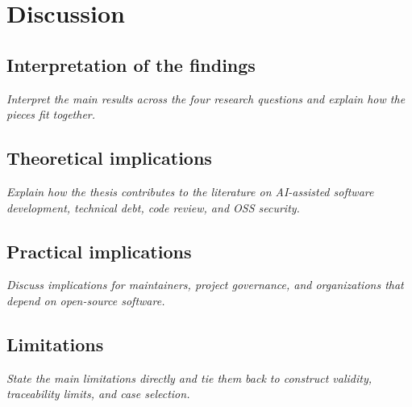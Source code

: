 \chapter{Discussion}
\label{ch:discussion}

\section{Interpretation of the findings}
\textit{Interpret the main results across the four research questions and explain how the pieces fit together.}

\section{Theoretical implications}
\textit{Explain how the thesis contributes to the literature on AI-assisted software development, technical debt, code review, and OSS security.}

\section{Practical implications}
\textit{Discuss implications for maintainers, project governance, and organizations that depend on open-source software.}

\section{Limitations}
\textit{State the main limitations directly and tie them back to construct validity, traceability limits, and case selection.}
